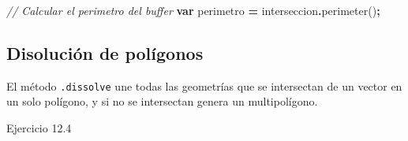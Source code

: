 \documentclass[
  12pt,
  letterpaper,
  twoside]{book}
\newenvironment{Shaded}{\begin{snugshade}}{\end{snugshade}}
\newcommand{\CommentTok}[1]{\textcolor[rgb]{0.56,0.35,0.01}{\textit{#1}}}
\newcommand{\FunctionTok}[1]{\textcolor[rgb]{0.00,0.00,0.00}{#1}}
\newcommand{\KeywordTok}[1]{\textcolor[rgb]{0.13,0.29,0.53}{\textbf{#1}}}
\newcommand{\NormalTok}[1]{#1}
\newcommand{\OperatorTok}[1]{\textcolor[rgb]{0.81,0.36,0.00}{\textbf{#1}}}
\begin{document}
\begin{Shaded}
\begin{Highlighting}[]
\CommentTok{// Calcular el perimetro del buffer}
\KeywordTok{var}\NormalTok{ perimetro }\OperatorTok{=}\NormalTok{ interseccion}\OperatorTok{.}\FunctionTok{perimeter}\NormalTok{()}\OperatorTok{;}
\end{Highlighting}
\end{Shaded}

\hypertarget{disoluciuxf3n-de-poluxedgonos}{%
\subsection*{Disolución de polígonos}\label{disoluciuxf3n-de-poluxedgonos}}

El método \texttt{.dissolve} une todas las geometrías que se intersectan de un vector en un solo polígono, y si no se intersectan genera un multipolígono.

Ejercicio 12.4
\end{document}
